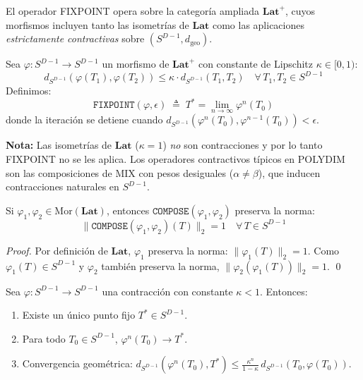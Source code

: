 \begin{definition}
\label{def:fixpoint}
El operador FIXPOINT opera sobre la categoría ampliada 
$\mathbf{Lat}^{+}$, cuyos morfismos incluyen tanto las isometrías
de $\mathbf{Lat}$ como las aplicaciones \emph{estrictamente 
contractivas} sobre $(S^{D-1}, d_{\text{geo}})$.

Sea $\varphi: S^{D-1} \to S^{D-1}$ un morfismo de $\mathbf{Lat}^{+}$
con constante de Lipschitz $\kappa \in [0, 1)$:
\begin{equation}
d_{S^{D-1}}(\varphi(T_1), \varphi(T_2)) \leq \kappa \cdot d_{S^{D-1}}(T_1, T_2) 
\quad \forall\, T_1, T_2 \in S^{D-1}
\end{equation}
Definimos:
\begin{equation}
\texttt{FIXPOINT}(\varphi, \epsilon) \;\triangleq\; 
T^* = \lim_{n \to \infty} \varphi^n(T_0)
\end{equation}
donde la iteración se detiene cuando 
$d_{S^{D-1}}(\varphi^n(T_0), \varphi^{n-1}(T_0)) < \epsilon$.

\textbf{Nota:} Las isometrías de $\mathbf{Lat}$ ($\kappa = 1$) 
\emph{no} son contracciones y por lo tanto FIXPOINT no se les aplica.
Los operadores contractivos típicos en POLYDIM son las composiciones
de MIX con pesos desiguales ($\alpha \neq \beta$), que inducen
contracciones naturales en $S^{D-1}$.
\end{definition}

\begin{lemma}
\label{lem:compose_norm}
Si $\varphi_1, \varphi_2 \in \text{Mor}(\mathbf{Lat})$, entonces
$\texttt{COMPOSE}(\varphi_1, \varphi_2)$ preserva la norma:
\begin{equation}
\|\texttt{COMPOSE}(\varphi_1, \varphi_2)(T)\|_2 = 1 \quad 
\forall\, T \in S^{D-1}
\end{equation}
\end{lemma}

\begin{proof}
Por definición de $\mathbf{Lat}$, $\varphi_1$ preserva la norma: 
$\|\varphi_1(T)\|_2 = 1$. Como $\varphi_1(T) \in S^{D-1}$ y $\varphi_2$ 
también preserva la norma, $\|\varphi_2(\varphi_1(T))\|_2 = 1$. \qed
\end{proof}

\begin{lemma}
\label{lem:fixpoint_convergence}
Sea $\varphi: S^{D-1} \to S^{D-1}$ una contracción con constante 
$\kappa < 1$. Entonces:
\begin{enumerate}
    \item Existe un único punto fijo $T^* \in S^{D-1}$.
    \item Para todo $T_0 \in S^{D-1}$, $\varphi^n(T_0) \to T^*$.
    \item Convergencia geométrica:
    $d_{S^{D-1}}(\varphi^n(T_0), T^*) \leq \frac{\kappa^n}{1 - \kappa}\, 
    d_{S^{D-1}}(T_0, \varphi(T_0))$.
\end{enumerate}
\end{lemma}

